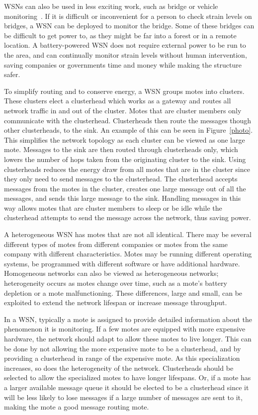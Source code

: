 WSNs can also be used in less exciting work, such as bridge or vehicle monitoring~\cite{StructuralMonitoring}.
If it is difficult or inconvenient for a person to check strain levels on bridges, a WSN
can be deployed to monitor the bridge. Some of these bridges can be difficult to get power to, as
they might be far into a forest or in a remote location. A battery-powered WSN does not require 
external power to be run to the area, and can continually monitor strain levels without human intervention,
saving companies or governments time and money while making the structure safer.
  
To simplify routing  and to conserve energy, a WSN  groups motes into 
clusters. These clusters elect a clusterhead which works as a gateway and 
routes all network traffic in and out of the cluster. Motes that are cluster 
members only communicate with the clusterhead. Clusterheads then route the 
messages though other clusterheads, to the sink. An example of this can be 
seen in Figure~\ref{photo}.  This simplifies the network topology as each cluster 
can be viewed as one large mote.  Messages to the sink are then routed through 
clusterheads only, which lowers the number of hops taken from the originating 
cluster to the sink. Using clusterheads reduces the energy draw from all motes 
that are in the cluster since they only need to send messages to the 
clusterhead. The clusterhead accepts messages from the motes in the cluster, 
creates one large message out of all the messages, and sends this large 
message to the sink. Handling messages in this way allows motes that are 
cluster members to sleep or be idle while the clusterhead attempts to send the 
message across the network, thus saving power.


A heterogeneous WSN has motes that are not all identical. There may be several 
different types of motes from different companies or motes from the same 
company with different characteristics.  Motes may be running different 
operating systems, be programmed with different software or have additional 
hardware. Homogeneous networks can also be viewed as heterogeneous 
networks; heterogeneity occurs as motes change over time, such as a mote's 
battery depletion or a mote malfunctioning. These differences, large and 
small, can be exploited to extend the network lifespan or increase message throughput.  

In a WSN, typically 
a mote is assigned to provide detailed information about the phenomenon it is 
monitoring. 
If a few motes are equipped with more expensive hardware, the network should 
adapt to allow these motes to live longer. This can be done by not allowing 
the more expensive mote to be a clusterhead, and by providing a clusterhead 
in range of the expensive mote.
As this specialization increases, so does the heterogeneity of the network. 
Clusterheads should be selected to allow the specialized motes to have  
longer lifespans. Or, if a mote has a larger available message queue it should be
elected to be a clusterhead since it will be less likely to lose messages
if a large number of messages are sent to it, making the mote a good message routing mote.

